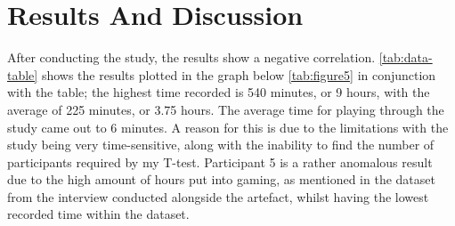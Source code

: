 \documentclass[conference]{IEEEtran}
\begin{document}
\section{Results And Discussion}
\begin{table}[H]
\centering
{}
\caption{Table 1 - The data collected from the experiment over two weeks.}
\label{tab:data-table}
\end{table}

After conducting the study, the results show a negative correlation. \ref{tab:data-table} shows the results plotted in the graph below \ref{tab:figure5} in conjunction with the table; the highest time recorded is 540 minutes, or 9 hours, with the average of 225
 minutes, or 3.75 hours. The average time for playing through the study came out to 6 minutes. A reason for this is due to the limitations with the study being very time-sensitive, along with the inability to find the number of participants required by my T-test. Participant 5 is a rather anomalous result due to the high amount of hours put into gaming, as mentioned in the dataset from the interview conducted alongside the artefact, whilst having the lowest recorded time within the dataset.
\end{document}
